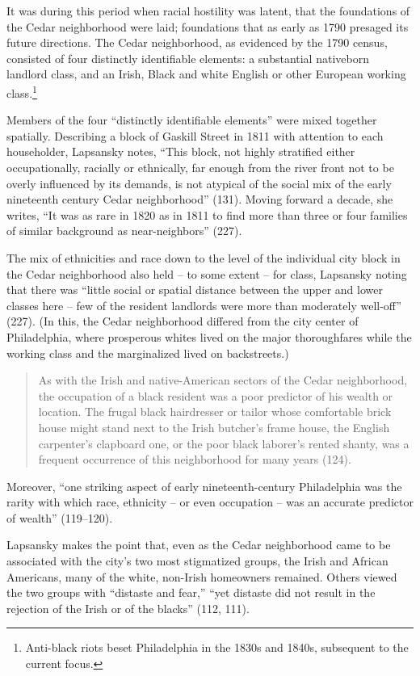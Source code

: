 \documentclass[output=paper,colorlinks,citecolor=brown]{langscibook}
\begin{document}
It was during this period when racial hostility was latent, that the foundations of the Cedar neighborhood were laid; foundations that as early as 1790 presaged its future directions. The Cedar neighborhood, as evidenced by the 1790 census, consisted of four distinctly identifiable elements: a substantial native\-born landlord class, and an Irish, Black and white English or other European working class.\footnote{{Anti-black riots beset Philadelphia in the 1830s and 1840s, subsequent to the current focus.}}

Members of the four “distinctly identifiable elements” were mixed together spatially. Describing a block of Gaskill Street in 1811 with attention to each householder, Lapsansky notes, “This block, not highly stratified either occupationally, racially or ethnically, far enough from the river front not to be overly influenced by its demands, is not atypical of the social mix of the early nineteenth century Cedar neighborhood” (131). Moving forward a decade, she writes, “It was as rare in 1820 as in 1811 to find more than three or four families of similar background as near-neighbors” (227).

The mix of ethnicities and race down to the level of the individual city block in the Cedar neighborhood also held -- to some extent -- for class, Lapsansky noting that there was “little social or spatial distance between the upper and lower classes here -- few of the resident landlords were more than moderately well-off” (227). (In this, the Cedar neighborhood differed from the city center of Philadelphia, where prosperous whites lived on the major thoroughfares while the working class and the marginalized lived on backstreets.)

\begin{quote}As with the Irish and native-American sectors of the Cedar neighborhood, the occupation of a black resident was a poor predictor of his wealth or location. The frugal black hairdresser or tailor whose comfortable brick house might stand next to the Irish butcher's frame house, the English carpenter's clapboard one, or the poor black laborer's rented shanty, was a frequent occurrence of this neighborhood for many years (124).\end{quote}

Moreover, “one striking aspect of early nineteenth-century Philadelphia was the rarity with which race, ethnicity -- or even occupation -- was an accurate predictor of wealth” (119--120).

Lapsansky makes the point that, even as the Cedar neighborhood came to be associated with the city’s two most stigmatized groups, the Irish and African Americans, many of the white, non-Irish homeowners remained. Others viewed the two groups with “distaste and fear,” “yet distaste did not result in the rejection of the Irish or of the blacks” (112, 111).
\end{document}
